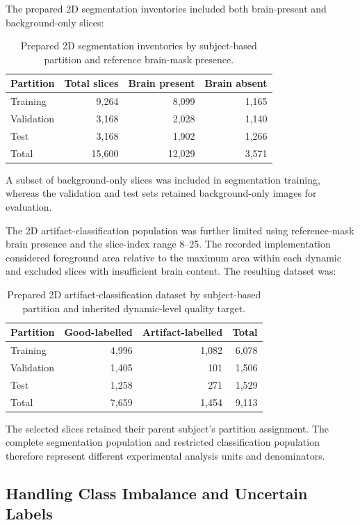 The prepared 2D segmentation inventories included both brain-present and background-only slices:
\begin{table}[htbp]
\centering
\caption{Prepared 2D segmentation inventories by subject-based partition and reference brain-mask presence.}
\label{tab:method_2d_segmentation_inventory}
\begin{tabular}{lrrr}
\hline
Partition & Total slices & Brain present & Brain absent \\
\hline
Training & 9,264 & 8,099 & 1,165 \\
Validation & 3,168 & 2,028 & 1,140 \\
Test & 3,168 & 1,902 & 1,266 \\
\hline
Total & 15,600 & 12,029 & 3,571 \\
\hline
\end{tabular}
\end{table}
A subset of background-only slices was included in segmentation training, whereas the validation and test sets retained background-only images for evaluation.

The 2D artifact-classification population was further limited using reference-mask brain presence and the slice-index range 8--25. The recorded implementation considered foreground area relative to the maximum area within each dynamic and excluded slices with insufficient brain content. The resulting dataset was:
\begin{table}[htbp]
\centering
\caption{Prepared 2D artifact-classification dataset by subject-based partition and inherited dynamic-level quality target.}
\label{tab:method_2d_classification_inventory}
\begin{tabular}{lrrr}
\hline
Partition & Good-labelled & Artifact-labelled & Total \\
\hline
Training & 4,996 & 1,082 & 6,078 \\
Validation & 1,405 & 101 & 1,506 \\
Test & 1,258 & 271 & 1,529 \\
\hline
Total & 7,659 & 1,454 & 9,113 \\
\hline
\end{tabular}
\end{table}
The selected slices retained their parent subject's partition assignment. The complete segmentation population and restricted classification population therefore represent different experimental analysis units and denominators.

\subsection{Handling Class Imbalance and Uncertain Labels}


